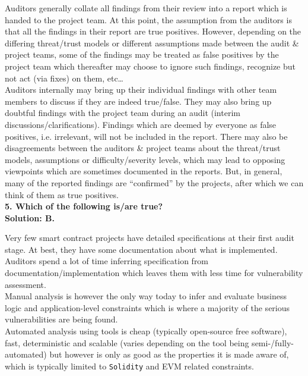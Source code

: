 Auditors generally collate all findings from their review into a report which is handed to the project team.
At this point, the assumption from the auditors is that all the findings in their report are true positives.
However, depending on the differing threat/trust models or different assumptions made between the audit \& project teams, some of the findings may be treated as false positives by the project team which thereafter may choose to ignore such findings, recognize but not act (via fixes) on them, etc\dots\\

Auditors internally may bring up their individual findings with other team members to discuss if they are indeed true/false.
They may also bring up doubtful findings with the project team during an audit (interim discussions/clarifications).
Findings which are deemed by everyone as false positives, i.e. irrelevant, will not be included in the report.
There may also be disagreements between the auditors \& project teams about the threat/trust models, assumptions or difficulty/severity levels, which may lead to opposing viewpoints which are sometimes documented in the reports.
But, in general, many of the reported findings are ``confirmed'' by the projects, after which we can think of them as true positives.\\

\textbf{5. Which of the following is/are true?}\label{sec:exam6_q5}\\

\textbf{Solution: B.}

Very few smart contract projects have detailed specifications at their first audit stage.
At best, they have some documentation about what is implemented.
Auditors spend a lot of time inferring specification from documentation/implementation which leaves them with less time for vulnerability assessment.\\

Manual analysis is however the only way today to infer and evaluate business logic and application-level constraints which is where a majority of the serious vulnerabilities are being found.\\

Automated analysis using tools is cheap (typically open-source free software), fast, deterministic and scalable (varies depending on the tool being semi-/fully-automated) but however is only as good as the properties it is made aware of, which is typically limited to \verb|Solidity| and EVM related constraints.\\


